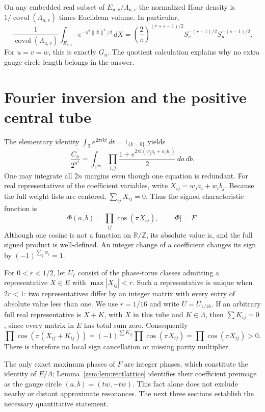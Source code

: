 \documentclass[11pt]{article}
\theoremstyle{definition}\newtheorem{definition}[theorem]{Definition}
\theoremstyle{remark}\newtheorem{remark}[theorem]{Remark}
\newcommand{\R}{\mathbb R}
\newcommand{\Z}{\mathbb Z}
\newcommand{\T}{\mathbb T}
\newcommand{\covol}{\operatorname{covol}}
\begin{document}
On any embedded real subset of $E_{u,v}/\Lambda_{u,v}$ the normalized Haar
density is $1/\covol(\Lambda_{u,v})$ times Euclidean volume. In particular,
\begin{equation}\label{zsm:eq:rectG}
 \frac1{\covol(\Lambda_{u,v})}
 \int_{E_{u,v}}e^{-\pi^2\|X\|^2/2}\,dX
 =\left(\frac2\pi\right)^{(r+s-1)/2}
   S_v^{-(r-1)/2}S_u^{-(s-1)/2}.
\end{equation}
For $u=v=w$, this is exactly $G_n$. The quotient calculation explains why no
extra gauge-circle length belongs in the answer.

\section{Fourier inversion and the positive central tube}\label{zsm:sec:fourier}
The elementary identity $\int_{\T}e^{2\pi ikt}\,dt=1_{\{k=0\}}$ yields
\begin{equation}\label{zsm:eq:fourier}
 \frac{C_n}{2^{n^2}}=
 \int_{\T^{2n}}\prod_{i,j}
    \frac{1+e^{2\pi i(w_ja_i+w_ib_j)}}2\,da\,db.
\end{equation}
One may integrate all $2n$ margins even though one equation is redundant.
For real representatives of the coefficient variables, write
$X_{ij}=w_ja_i+w_ib_j$. Because the full weight lists are centered,
$\sum_{ij}X_{ij}=0$. Thus the signed characteristic function is
\begin{equation}\label{zsm:eq:Phi}
 \Phi(a,b)=\prod_{ij}\cos(\pi X_{ij}),\qquad |\Phi|=F.
\end{equation}
Although one cosine is not a function on $\R/\Z$, its absolute value is, and
the full signed product is well-defined. An integer change of a coefficient
changes its sign by $(-1)^{\sum_jw_j}=1$.

For $0<r<1/2$, let $U_r$ consist of the phase-torus classes admitting a
representative $X\in E$ with $\max|X_{ij}|<r$. Such a representative is unique
when $2r<1$: two representatives differ by an integer matrix with every entry
of absolute value less than one. We use $r=1/16$ and write $U=U_{1/16}$.
If an arbitrary full real representative is $X+K$, with $X$ in this tube and
$K\in\Lambda$, then $\sum K_{ij}=0$, since every matrix in $E$ has total sum
zero. Consequently
\[
 \prod\cos(\pi(X_{ij}+K_{ij}))
 =(-1)^{\sum K_{ij}}\prod\cos(\pi X_{ij})
 =\prod\cos(\pi X_{ij})>0.
\]
There is therefore no local sign cancellation or missing parity multiplier.

The only exact maximum phases of $F$ are integer phases, which constitute the
identity of $E/\Lambda$; Lemma~\ref{zsm:lem:rectlattice} identifies their coefficient
preimage as the gauge circle $(a,b)=(tw,-tw)$. This fact alone does not exclude
nearby or distant approximate resonances. The next three sections establish
the necessary quantitative statement.
\end{document}
